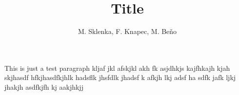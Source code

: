 \documentclass[12pt,a4paper,draft]{article}
\title{Title}
\author{M. Sklenka, F. Knapec, M. Beňo}
\date{}
\begin{document}
\maketitle

This is just a test paragraph kljaf jkl afskjkl akh fk asjdhkjs
kajfhkajh  kjah skjhasdf  hfkjhasdfkjhlk hadsflk jhsfdlk jhadsf
k afkjh lkj adsf  ha sdfk jafk ljkj jhakjh asdfkjfh kj aakjhkjj
\end{document}
